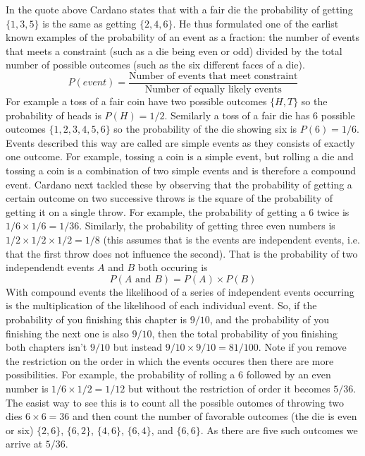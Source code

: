 In the quote above Cardano states that with a fair die the probability of getting $\{1,3,5\}$ is the same as getting $\{2,4,6\}$. He thus formulated one of the earlist known examples of the probability of an event as a fraction: the number of events that meets a constraint (such as a die being even or odd) divided by the total number of possible outcomes (such as the six different faces of a die). 
\begin{equation}\label{prob:simple-event}
P(event) = \frac{\text{Number of events that meet constraint}}{\text{Number of equally likely events}}
\end{equation}
For example a toss of a fair coin have two possible outcomes $\{H,T\}$ so the probability of heads is $P(H) = 1/2$. Semilarly a toss of a fair die has $6$ possible outcomes $\{1, 2, 3, 4, 5, 6\}$ so the probability of the die showing six is $P(6) = 1/6$. Events described this way are called are simple events as they consists of exactly one outcome. For example, tossing a coin is a simple event, but rolling a die and tossing a coin is a combination of two simple events and is therefore a compound event. Cardano next tackled these by observing that the probability of getting a certain outcome on two successive throws is the square of the probability of getting it on a single throw. For example, the probability of getting a $6$ twice is $1/6 \times 1/6 = 1/36$. Similarly, the probability of getting three even numbers is $1/2 \times 1/2 \times 1/2 = 1/8$ (this assumes that is the events are independent events, i.e. that the first throw does not influence the second). That is the probability of two independendt events $A$ and $B$ both occuring is
\begin{equation}\label{prob:compound-event}
P(A \text{ and } B) = P(A) \times P(B)
\end{equation}
With compound events the likelihood of a series of independent events occurring is the multiplication of the likelihood of each individual event. So, if the probability of you finishing this chapter is $9/10$, and the probability of you finishing the next one is also $9/10$, then the total probability of you finishing both chapters isn't $9/10$ but instead $9/10 \times 9/10 = 81/100$. Note if you remove the restriction on the order in which the events occures then there are more possibilities. For example, the probability of rolling a $6$ followed by an even number is $1/6 \times 1/2 = 1/12$ but without the restriction of order it becomes $5/36$. The easist way to see this is to count all the possible outomes of throwing two dies $6 \times 6 = 36$ and then count the number of favorable outcomes (the die is even or six) $\{2,6\}$, $\{6,2\}$, $\{4,6\}$, $\{6,4\}$, and $\{6,6\}$. As there are five such outcomes we arrive at $5/36$. 

